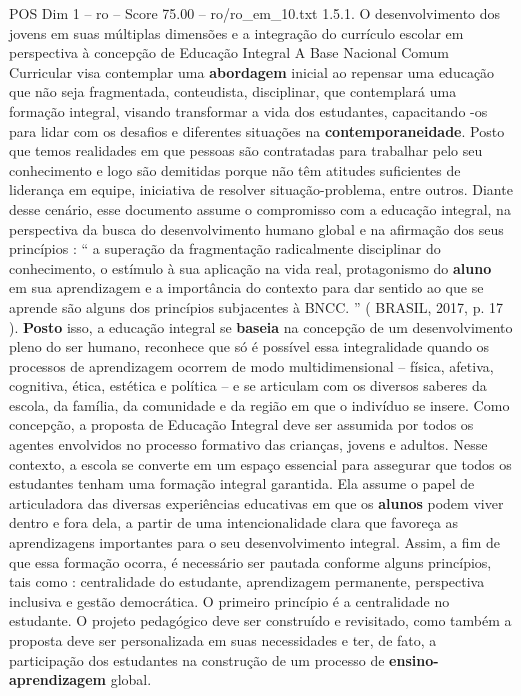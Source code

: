 \begin{textsample}{POS Dim 1 – ro – Score 75.00 – ro/ro\_em\_10.txt}  \label{ex:f1_pos_131}
1.5.1.
O desenvolvimento dos jovens em suas múltiplas dimensões e a integração do currículo escolar em perspectiva à concepção de Educação Integral A Base Nacional Comum Curricular visa contemplar uma \textbf{abordagem} inicial ao repensar uma educação que não seja fragmentada, conteudista, disciplinar, que contemplará uma formação integral, visando transformar a vida dos estudantes, capacitando -os para lidar com os desafios e diferentes situações na \textbf{contemporaneidade}.
Posto que temos realidades em que pessoas são contratadas para trabalhar pelo seu conhecimento e logo são demitidas porque não têm atitudes suficientes de liderança em equipe, iniciativa de resolver situação-problema, entre outros.
Diante desse cenário, esse documento assume o compromisso com a educação integral, na perspectiva da busca do desenvolvimento humano global e na afirmação dos seus princípios : “ a superação da fragmentação radicalmente disciplinar do conhecimento, o estímulo à sua aplicação na vida real, protagonismo do \textbf{aluno} em sua aprendizagem e a importância do contexto para dar sentido ao que se aprende são alguns dos princípios subjacentes à BNCC. ” ( BRASIL, 2017, p. 17 ). \textbf{Posto} isso, a educação integral se \textbf{baseia} na concepção de um desenvolvimento pleno do ser humano, reconhece que só é possível essa integralidade quando os processos de aprendizagem ocorrem de modo multidimensional – física, afetiva, cognitiva, ética, estética e política – e se articulam com os diversos saberes da escola, da família, da comunidade e da região em que o indivíduo se insere.
Como concepção, a proposta de Educação Integral deve ser assumida por todos os agentes envolvidos no processo formativo das crianças, jovens e adultos.
Nesse contexto, a escola se converte em um espaço essencial para assegurar que todos os estudantes tenham uma formação integral garantida.
Ela assume o papel de articuladora das diversas experiências educativas em que os \textbf{alunos} podem viver dentro e fora dela, a partir de uma intencionalidade clara que favoreça as aprendizagens importantes para o seu desenvolvimento integral.
Assim, a fim de que essa formação ocorra, é necessário ser pautada conforme alguns princípios, tais como : centralidade do estudante, aprendizagem permanente, perspectiva inclusiva e gestão democrática.
O primeiro princípio é a centralidade no estudante.
O projeto pedagógico deve ser construído e revisitado, como também a proposta deve ser personalizada em suas necessidades e ter, de fato, a participação dos estudantes na construção de um processo de \textbf{ensino-aprendizagem} global.

\end{textsample}
